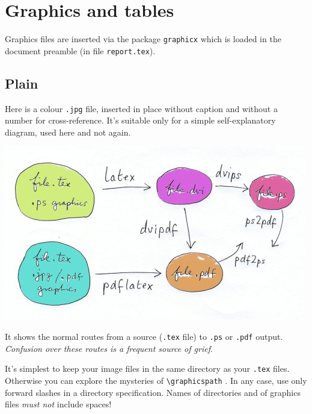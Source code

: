 \chapter{Graphics and tables}\label{sec:graphics}
Graphics files are inserted via the package \texttt{graphicx} which is
loaded in the document preamble (in file \texttt{report.tex}).
%
\section{Plain}
Here is a colour \texttt{.jpg} file, inserted in place without caption
and without a number for cross-reference. It's suitable only for a
simple self-explanatory diagram, used here and not again.
\begin{center}
\includegraphics[width=.7\textwidth]{pic1.jpg}
\end{center}
It shows the normal routes from a source (\texttt{.tex} file) to
\texttt{.ps} or \texttt{.pdf} output. \textit{Confusion over these
routes is a frequent source of grief}.
\par
It's simplest to keep your image files in the same directory as your
\texttt{.tex} files. Otherwise you can explore the mysteries of
\verb+\graphicspath+ \cite[Sec.~10.2.5]{MG}. In any case, use only
forward slashes in a directory specification. Names of directories and
of graphics files \textit{must not} include spaces!
%
